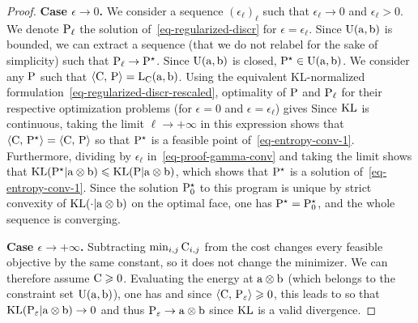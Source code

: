 \begin{proof}
	\textbf{Case $\epsilon \rightarrow 0$.}
	 We consider a sequence $(\epsilon_\ell)_\ell$ such that $\epsilon_\ell \rightarrow 0$ and $\epsilon_\ell > 0$.
	We denote $\P_\ell$ the solution of~\eqref{eq-regularized-discr} for $\epsilon=\epsilon_\ell$.
	Since $\CouplingsD(\a,\b)$ is bounded, we can extract a sequence (that we do not relabel for the sake of simplicity) such that $\P_\ell \rightarrow \P^\star$. Since $\CouplingsD(\a,\b)$ is closed, $\P^\star \in \CouplingsD(\a,\b)$. We consider any $\P$ such that $\dotp{\C}{\P} = \MKD_\C(\a,\b)$. Using the equivalent KL-normalized formulation~\eqref{eq-regularized-discr-rescaled}, optimality of $\P$ and $\P_\ell$ for their respective optimization problems (for $\epsilon=0$ and $\epsilon=\epsilon_\ell$) gives
	Since $\KLD$ is continuous, taking the limit $\ell \rightarrow +\infty$ in this expression shows that
	$\dotp{\C}{\P^\star} = \dotp{\C}{\P}$ so that $\P^\star$ is a feasible point of~\eqref{eq-entropy-conv-1}. Furthermore, dividing by $\epsilon_\ell$ in~\eqref{eq-proof-gamma-conv} and taking the limit shows that
		$\KLD(\P^\star|\a \otimes \b) \leq \KLD(\P|\a \otimes \b)$, which shows that $\P^\star$ is a solution of~\eqref{eq-entropy-conv-1}. Since the solution $\P_0^\star$ to this program is unique by strict convexity of $\KLD(\cdot|\a \otimes \b)$ on the optimal face, one has $\P^\star = \P_0^\star$, and the whole sequence is converging.


\textbf{Case $\epsilon \rightarrow +\infty$.}
Subtracting $\min_{i,j}\C_{i,j}$ from the cost changes every feasible objective by the same constant, so it does not change the minimizer. We can therefore assume $\C\geq0$. Evaluating the energy at $\a \otimes \b$ (which belongs to the constraint set $\CouplingsD(\a,\b)$), one has
	and since $\dotp{\C}{\P_\epsilon} \geq 0$, this leads to
	so that $\KLD(\P_\epsilon|\a \otimes \b) \rightarrow 0$ and thus $\P_\epsilon \rightarrow \a \otimes \b$ since $\KLD$ is a valid divergence.
\end{proof}


